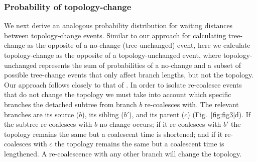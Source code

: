 \documentclass[11pt]{article}
\begin{document}
\subsubsection{Probability of topology-change}

We next derive an analogous probability distribution for waiting distances 
between topology-change events.
Similar to our approach for calculating tree-change as the opposite of a 
no-change (tree-unchanged) event, here we calculate topology-change as the 
opposite of a topology-unchanged event, where topology-unchanged represents the 
sum of probabilities of a no-change and a subset of possible tree-change events 
that only affect branch lengths, but not the topology. 
Our approach follows closely to that of \citet{deng_distribution_2021}.
In order to isolate re-coalesce events that do not change the topology
we must take into account which specific branches the detached subtree from 
branch $b$ re-coalesces with. The relevant branches are its source ($b$), 
its sibling ($b'$), and its parent ($c$) (Fig.~\ref{fig:fig3}d). 
If the subtree re-coalesces with $b$ no change occurs; if it re-coalesces
with $b'$ the topology remains the same but a coalescent time is shortened;
and if it re-coalesces with $c$ the topology remains the same but a coalescent 
time is lengthened. A re-coalescence with any other branch will change the topology.






\end{document}

